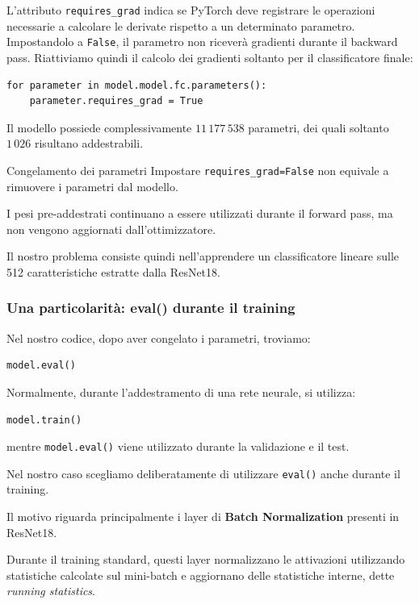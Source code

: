 \documentclass[10pt,a4paper,oneside]{book}
\begin{document}
L'attributo \texttt{requires\_grad} indica se PyTorch
deve registrare le operazioni necessarie a calcolare
le derivate rispetto a un determinato parametro.
Impostandolo a \texttt{False}, il parametro non
riceverà gradienti durante il backward pass.
Riattiviamo quindi il calcolo dei gradienti
soltanto per il classificatore finale:

\begin{verbatim}
for parameter in model.model.fc.parameters():
    parameter.requires_grad = True
\end{verbatim}

Il modello possiede complessivamente
$11\,177\,538$ parametri, dei quali soltanto
$1\,026$ risultano addestrabili.

\begin{importantbox}{Congelamento dei parametri}
Impostare \texttt{requires\_grad=False} non equivale
a rimuovere i parametri dal modello.

I pesi pre-addestrati continuano a essere utilizzati
durante il forward pass, ma non vengono aggiornati
dall'ottimizzatore.

Il nostro problema consiste quindi nell'apprendere
un classificatore lineare sulle 512 caratteristiche
estratte dalla ResNet18.
\end{importantbox}

\subsubsection{Una particolarità: eval() durante il training}

Nel nostro codice, dopo aver congelato i parametri,
troviamo:

\begin{verbatim}
model.eval()
\end{verbatim}

Normalmente, durante l'addestramento di una rete
neurale, si utilizza:

\begin{verbatim}
model.train()
\end{verbatim}

mentre \texttt{model.eval()} viene utilizzato
durante la validazione e il test.

Nel nostro caso scegliamo deliberatamente di
utilizzare \texttt{eval()} anche durante il training.

Il motivo riguarda principalmente i layer
di \textbf{Batch Normalization} presenti in ResNet18.

Durante il training standard, questi layer
normalizzano le attivazioni utilizzando statistiche
calcolate sul mini-batch e aggiornano delle
statistiche interne, dette \textit{running statistics}.
\end{document}
